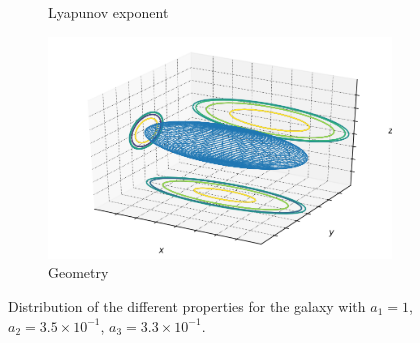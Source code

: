 \begin{figure}[h]
\begin{subfigure}[t]{0.4\textwidth}
        \caption{Lyapunov exponent}
    \end{subfigure}
    \begin{subfigure}[t]{0.4\textwidth}
        \includegraphics[width=\textwidth]{"../Files/Week 13/images/15_ellipsoid"}
        \caption{Geometry}
    \end{subfigure}
    \caption{Distribution of the different properties for the galaxy with $a_1 = 1$, $a_2 = 3.5\times10^{-1}$, $a_3 = 3.3\times10^{-1}$.}
    \label{fig: g25}
\end{figure}


